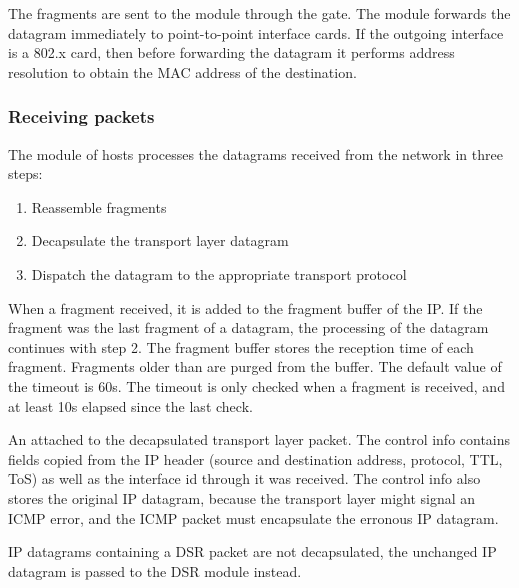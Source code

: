 The fragments are sent to the  module through the  gate.
The  module forwards the datagram immediately to point-to-point interface
cards. If the outgoing interface is a 802.x card, then before forwarding the datagram
it performs address resolution to obtain the MAC address of the destination.



\subsubsection*{Receiving packets}

The  module of hosts processes the datagrams received from the network
in three steps:
\begin{enumerate}
  \item Reassemble fragments
  \item Decapsulate the transport layer datagram
  \item Dispatch the datagram to the appropriate transport protocol
\end{enumerate}

When a fragment received, it is added to the fragment buffer of the IP.
If the fragment was the last fragment of a datagram, the processing of 
the datagram continues with step 2. The fragment buffer stores the reception
time of each fragment. Fragments older than  are
purged from the buffer. The default value of the timeout is 60s. The
timeout is only checked when a fragment is received, and at least 10s
elapsed since the last check.

An  attached to the decapsulated transport layer packet.
The control info contains fields copied from the IP header (source and destination
address, protocol, TTL, ToS) as well as the interface id through it was received.
The control info also stores the original IP datagram, because the transport
layer might signal an ICMP error, and the ICMP packet must encapsulate the
erronous IP datagram.
\begin{note}
IP datagrams containing a DSR packet are not decapsulated, the unchanged IP
datagram is passed to the DSR module instead.
\end{note}


